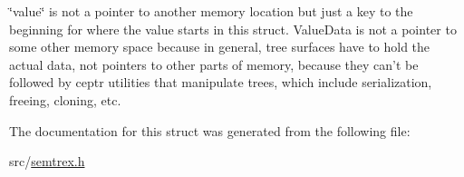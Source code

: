 \char`\"{}value\char`\"{} is not a pointer to another memory location but just a key to the beginning for where the value starts in this struct. Value\+Data is not a pointer to some other memory space because in general, tree surfaces have to hold the actual data, not pointers to other parts of memory, because they can't be followed by ceptr utilities that manipulate trees, which include serialization, freeing, cloning, etc. 

The documentation for this struct was generated from the following file\+:\begin{DoxyCompactItemize}
\item 
src/\hyperlink{semtrex_8h}{semtrex.\+h}\end{DoxyCompactItemize}

